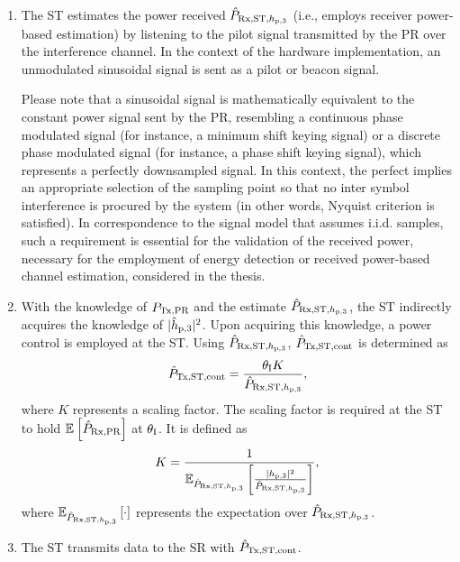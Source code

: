 \begin{enumerate}
	\item The ST estimates the power received $\hat{P}_{\text{Rx,ST,$h_{\text{p,3}}$}}$ (i.e., employs receiver power-based estimation) by listening to the pilot signal transmitted by the PR over the interference channel. In the context of the hardware implementation, an unmodulated sinusoidal signal is sent as a pilot or beacon signal. 

Please note that a sinusoidal signal is mathematically equivalent to the constant power signal sent by the PR, resembling a continuous phase modulated signal (for instance, a minimum shift keying signal) or a discrete phase modulated signal (for instance, a phase shift keying signal), which represents a perfectly downsampled signal. In this context, the perfect implies an appropriate selection of the sampling point so that no inter symbol interference is procured by the system (in other words, Nyquist criterion is satisfied). In correspondence to the signal model that assumes i.i.d. samples, such a requirement is essential for the validation of the received power, necessary for the employment of energy detection or received power-based channel estimation, considered in the thesis.
	\item With the knowledge of $P_{\text{Tx,PR}}$ and the estimate $\hat{P}_{\text{Rx,ST,$h_{\text{p,3}}$}}$, the ST indirectly acquires the knowledge of $|\hat{h}_{\text{p,3}}|^2$. 
	Upon acquiring this knowledge, a power control is employed at the ST. Using $\hat{P}_{\text{Rx,ST,$h_{\text{p,3}}$}}$, $\hat{P}_{\text{Tx,ST,cont}}$ is determined as 
\begin{align}
\hat{P}_{\text{Tx,ST,cont}} = \frac{\theta_{\text{I}} K}{\hat{P}_{\text{Rx,ST,$h_{\text{p,3}}$}}}, \label{eq_HVD:preg} 
\end{align}
where $K$ represents a scaling factor. The scaling factor is required at the ST to hold ${\mathbb E}_{}\left[ \hat{P}_{\text{Rx,PR}} \right]$ at $\theta_{\text{I}}$. It is defined as
\begin{align}
K = \frac{1}{ {\mathbb E}_{\hat{P}_{\text{Rx,ST,$h_{\text{p,3}}$}}}\left[ \frac{|h_{\text{p,3}}|^2}{\hat{P}_{\text{Rx,ST,$h_{\text{p,3}}$}}} \right]}, \label{eq_HVD:sca} 
\end{align}
where ${\mathbb E}_{\hat{P}_{\text{Rx,ST,$h_{\text{p,3}}$}}}\left[ \cdot \right]$ represents the expectation over $\hat{P}_{\text{Rx,ST,$h_{\text{p,3}}$}}$.
	\item The ST transmits data to the SR with $\hat{P}_{\text{Tx,ST,cont}}$. 

\end{enumerate}
